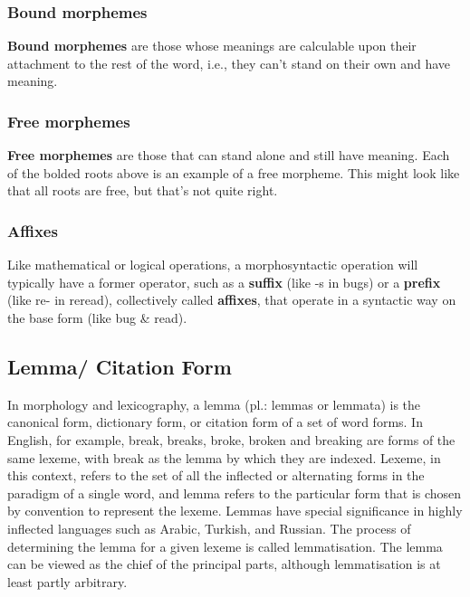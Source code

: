 \subsubsection{Bound morphemes}\label{Language: Bound morphemes} 
\textbf{Bound morphemes} are those whose meanings are calculable upon their attachment to the rest of the word, i.e., they can't stand on their own and have meaning.

\subsubsection{Free morphemes}\label{Language: Free morphemes}
\textbf{Free morphemes} are those that can stand alone and still have meaning. Each of the bolded roots above is an example of a free morpheme. This might look like that all roots are free, but that’s not quite right.

\subsubsection{Affixes}\label{Language: Affixes}
Like mathematical or logical operations, a morphosyntactic operation will typically have a former operator, such as a \textbf{suffix}  (like -s in bugs) or a \textbf{prefix}  (like re- in reread), collectively called \textbf{affixes}, that operate in a syntactic way on the base form (like bug \& read).


\subsection{Lemma/ Citation Form \cite{wiki-Lemma_morphology}}\label{lemma}
In morphology and lexicography, a lemma (pl.: lemmas or lemmata) is the canonical form, dictionary form, or citation form of a set of word forms. In English, for example, break, breaks, broke, broken and breaking are forms of the same lexeme, with break as the lemma by which they are indexed. Lexeme, in this context, refers to the set of all the inflected or alternating forms in the paradigm of a single word, and lemma refers to the particular form that is chosen by convention to represent the lexeme. Lemmas have special significance in highly inflected languages such as Arabic, Turkish, and Russian. The process of determining the lemma for a given lexeme is called lemmatisation. The lemma can be viewed as the chief of the principal parts, although lemmatisation is at least partly arbitrary.


